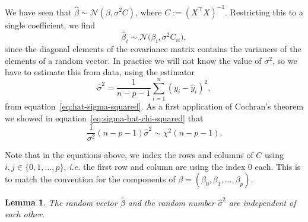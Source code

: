 \documentclass[
  a4paper,
]{article}
\newtheorem{lemma}{Lemma}[section]
\theoremstyle{definition}
\theoremstyle{definition}
\theoremstyle{definition}
\theoremstyle{definition}
\theoremstyle{remark}
\begin{document}
We have seen that \(\hat\beta \sim \mathcal{N}(\beta, \sigma^2 C)\), where
\(C := (X^\top X)^{-1}\). Restricting this to a single coefficient, we find
\begin{equation*}
  \hat\beta_i
  \sim \mathcal{N}\bigl( \beta_i, \sigma^2 C_{ii} \bigr),
\end{equation*}
since the diagonal elements of the covariance matrix contains the
variances of the elements of a random vector. In practice we will not
know the value of \(\sigma^2\), so we have to estimate this from data,
using the estimator
\begin{equation*}
  \hat\sigma^2
  = \frac{1}{n-p-1} \sum_{i=1}^n (y_i - \hat y_i)^2,
\end{equation*}
from equation~\eqref{eq:hat-sigma-squared}. As a first application of
Cochran's theorem we showed in equation~\eqref{eq:sigma-hat-chi-squared}
that
\begin{equation*}
  \frac{1}{\sigma^2} (n - p - 1) \hat\sigma^2
  \sim \chi^2(n - p - 1).
\end{equation*}

Note that in the equations above, we index the rows and columns of \(C\)
using \(i,j\in \{0, 1, \ldots, p\}\), \emph{i.e.} the first row and column are
using the index 0 each. This is to match the convention for the
components of \(\beta = (\beta_0, \beta_1, \ldots, \beta_p)\).

\begin{lemma}
\protect\hypertarget{lem:hat-beta-sigma-indep}{}\label{lem:hat-beta-sigma-indep}The random vector \(\hat\beta\) and the random number
\(\hat\sigma^2\) are independent of each other.
\end{lemma}
\end{document}
